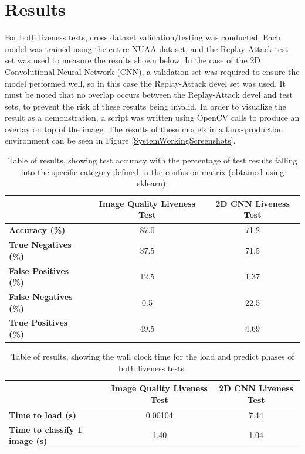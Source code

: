 \documentclass[10pt,a4paper]{article}
\begin{document}
\section{Results}
    For both liveness tests, cross dataset validation/testing was conducted. Each model was trained using the entire NUAA dataset, and the Replay-Attack test set
    was used to measure the results shown below. In the case of the 2D Convolutional Neural Network (CNN), a validation set was required to ensure the model performed
    well, so in this case the Replay-Attack devel set was used. It must be noted that no overlap occurs between the Replay-Attack devel and test sets, to prevent the risk
    of these results being invalid. In order to visualize the result as a demonstration, a script was written using OpenCV calls to produce an overlay on top of the image.
    The results of these models in a faux-production environment can be seen in Figure \ref{SystemWorkingScreenshots}. 
    \begin{table}[ht]
        \centering
        \begin{tabular}[t]{lcc}
            \toprule
             & \textbf{Image Quality Liveness Test} & \textbf{2D CNN Liveness Test}\\
             \midrule
            \textbf{Accuracy (\%)} & 87.0 & 71.2\\
            \midrule
            \textbf{True Negatives (\%)} & 37.5 & 71.5\\
            \textbf{False Positives (\%)} & 12.5 & 1.37\\
            \textbf{False Negatives (\%)} & 0.5 & 22.5\\
            \textbf{True Positives (\%)} & 49.5 & 4.69\\
            \bottomrule
        \end{tabular}
        \caption{Table of results, showing test accuracy with the percentage of test results falling into the specific category defined in the confusion matrix (obtained using sklearn).}
        \label{ResultsTable}
    \end{table}

    \begin{table}[ht]
        \centering
        \begin{tabular}[t]{lcc}
            \toprule
             & \textbf{Image Quality Liveness Test} & \textbf{2D CNN Liveness Test}\\
             \midrule
            \textbf{Time to load (s)} & 0.00104 & 7.44\\
            \textbf{Time to classify 1 image (s)} & 1.40 & 1.04\\
            \bottomrule
        \end{tabular}
        \caption{Table of results, showing the wall clock time for the load and predict phases of both liveness tests.}
        \label{WallClockResultsTime}
    \end{table}
\end{document}
